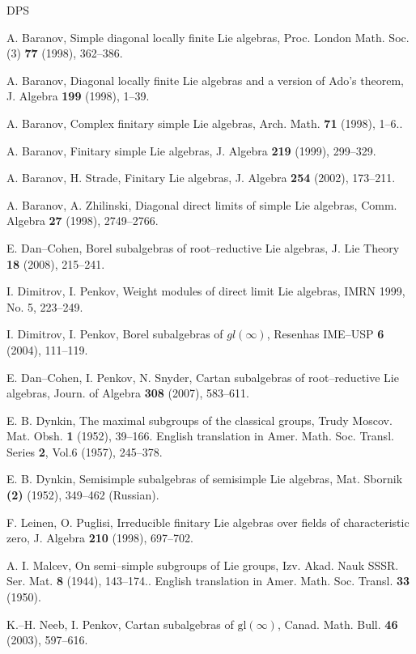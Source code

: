 \documentclass[oneside,leqno,12pt]{article}
\newcounter{theorem}
\newcommand{\gl}{\mathrm{gl}}
\begin{document}
\begin{thebibliography}{DPS}

A. Baranov, Simple diagonal locally finite Lie algebras, Proc. London Math. Soc. (3) {\bf 77} (1998), 362--386.

A. Baranov, Diagonal locally finite Lie algebras and a version of Ado's theorem, J. Algebra {\bf 199} (1998), 1--39.

A. Baranov, Complex finitary simple Lie algebras, Arch. Math. {\bf 71} (1998), 1--6..

A. Baranov, Finitary simple Lie algebras, J. Algebra \textbf{219} (1999), 299--329.

A. Baranov, H. Strade, Finitary Lie algebras, J. Algebra {\bf 254} (2002), 173--211.

 A. Baranov, A. Zhilinski, Diagonal direct limits of simple Lie algebras, Comm. Algebra \textbf{27} (1998), 2749--2766.

 E. Dan--Cohen, Borel subalgebras of root--reductive Lie algebras, J. Lie Theory \textbf{18} (2008), 215--241. 

 I. Dimitrov, I. Penkov, Weight modules of direct limit Lie algebras, IMRN 1999, No. 5, 223--249.

 I. Dimitrov, I. Penkov, Borel subalgebras of $gl(\infty)$, Resenhas IME--USP \textbf{6} (2004), 111--119.

 E. Dan--Cohen, I. Penkov, N. Snyder, Cartan subalgebras of root--reductive Lie algebras, Journ. of Algebra \textbf{308} (2007), 583--611.

 E. B. Dynkin, The maximal subgroups of the classical groups, Trudy Moscov. Mat. Obsh. \textbf{1} (1952), 39--166. English translation in Amer. Math. Soc. Transl. Series \textbf{2}, Vol.6 (1957), 245--378.

 E. B. Dynkin, Semisimple subalgebras of semisimple Lie algebras, Mat. Sbornik \textbf{(2)} (1952), 349--462 (Russian).

F. Leinen, O. Puglisi, Irreducible finitary Lie algebras over fields of characteristic zero, J. Algebra {\bf 210} (1998), 697--702.

 A. I. Malcev, On semi--simple subgroups of Lie groups, Izv. Akad. Nauk SSSR. Ser. Mat. \textbf{8} (1944), 143--174.. 
English translation in Amer. Math. Soc. Transl. {\bf 33} (1950).


 K.--H. Neeb, I. Penkov, Cartan subalgebras of $\gl(\infty)$, Canad. Math. Bull. \textbf{46} (2003), 597--616. 
\end{thebibliography}
\end{document}
